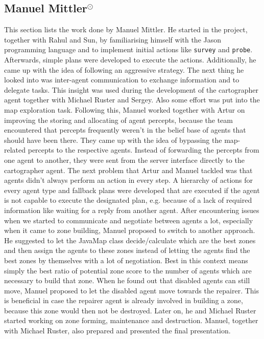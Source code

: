 \subsection[Manuel Mittler]{Manuel Mittler$^{\odot}$}
This section lists the work done by Manuel Mittler.
He started in the project, together with Rahul and Sun, by familiarising himself with the Jason programming language and to implement initial actions like \texttt{survey} and \texttt{probe}.
Afterwards, simple plans were developed to execute the actions.
Additionally, he came up with the idea of following an aggressive strategy.
The next thing he looked into was inter-agent communication to exchange information and to delegate tasks.
This insight was used during the development of the cartographer agent together with Michael Ruster and Sergey.
Also some effort was put into the map exploration task.
Following this, Manuel worked together with Artur on improving the storing and allocating of agent percepts, because the team encountered that percepts frequently weren't in the belief base of agents that should have been there.
They came up with the idea of bypassing the map-related percepts to the respective agents.
Instead of forwarding the percepts from one agent to another, they were sent from the server interface directly to the cartographer agent.
The next problem that Artur and Manuel tackled was that agents didn't always perform an action in every step.
A hierarchy of actions for every agent type and fallback plans were developed that are executed if the agent is not capable to execute the designated plan, e.g. because of a lack of required information like waiting for a reply from another agent.
After encountering issues when we started to communicate and negotiate between agents a lot, especially when it came to zone building, Manuel proposed to switch to another approach.
He suggested to let the JavaMap class decide/calculate which are the best zones and then assign the agents to these zones instead of letting the agents find the best zones by themselves with a lot of negotiation.
Best in this context means simply the best ratio of potential zone score to the number of agents which are necessary to build that zone.
When he found out that disabled agents can still move, Manuel proposed to let the disabled agent move towards the repairer.
This is beneficial in case the repairer agent is already involved in building a zone, because this zone would then not be destroyed.
Later on, he and Michael Ruster started working on zone forming, maintenance and destruction.
Manuel, together with Michael Ruster, also prepared and presented the final presentation.
